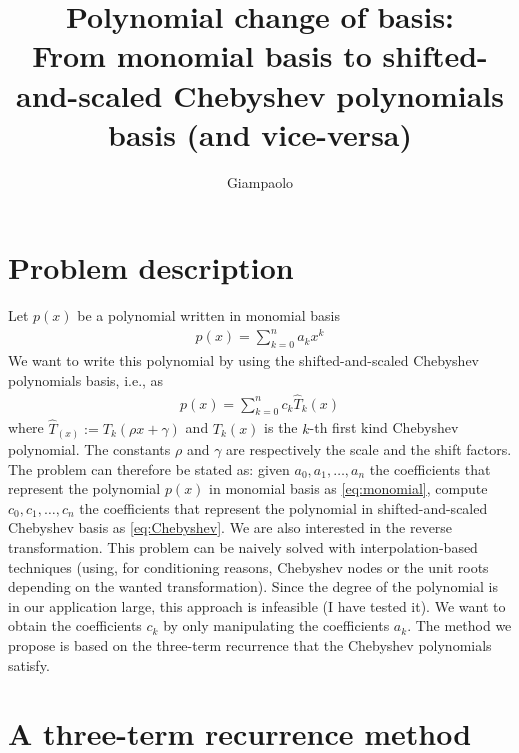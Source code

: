 \documentclass[a4paper,10pt]{article}
\title{Polynomial change of basis: \\ From monomial basis to shifted-and-scaled Chebyshev polynomials basis (and vice-versa)}
\author{Giampaolo}
\theoremstyle{plain}
\begin{document}
\maketitle

\begin{abstract}

\end{abstract}

\section{Problem description}
Let $p(x)$ be a polynomial written in monomial basis 
\begin{align} \label{eq:monomial}
 p(x) = \sum_{k=0}^n a_k x^k 
\end{align}
We want to write this polynomial by using the shifted-and-scaled Chebyshev polynomials basis, i.e., as
\begin{align} \label{eq:Chebyshev}
 p(x) = \sum_{k=0}^n c_k \hat T_k(x) 
\end{align}
where $\hat T_(x):=T_k(\rho x + \gamma)$ and $T_k(x)$ is the $k$-th first kind Chebyshev polynomial. The constants $\rho$ and $\gamma$ are respectively the scale and the shift factors. 
\\[0.6cm]
The problem can therefore be stated as: given $a_0, a_1, \dots, a_n$ the coefficients that represent the polynomial $p(x)$ in monomial basis as \eqref{eq:monomial}, compute  $c_0, c_1, \dots, c_n$ the coefficients that represent the polynomial in shifted-and-scaled Chebyshev basis as \eqref{eq:Chebyshev}. We are also interested in the reverse transformation. This problem can be naively solved with interpolation-based techniques (using, for conditioning reasons, Chebyshev nodes or the unit roots depending on the wanted transformation). Since the degree of the polynomial is in our application large, this approach is infeasible (I have tested it). We want to obtain the coefficients $c_k$ by only manipulating the coefficients $a_k$. The method we propose is based on the three-term recurrence that the Chebyshev polynomials satisfy.

\section{A three-term recurrence method}
\end{document}
